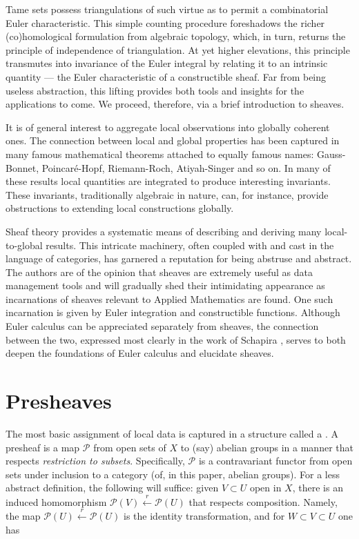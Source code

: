 \documentclass{psapm-l}
\theoremstyle{definition}
\theoremstyle{remark}
\numberwithin{equation}{section}
\begin{document}
Tame sets possess triangulations of such virtue as to permit a combinatorial Euler characteristic. This simple counting procedure foreshadows the  richer (co)homological formulation from algebraic topology, which, in turn, returns the principle of independence of triangulation. At yet higher elevations, this principle transmutes into invariance of the Euler integral by relating it to an intrinsic quantity --- the Euler characteristic of a constructible sheaf. Far from being useless abstraction, this lifting provides both tools and insights for the applications to come. We proceed, therefore, via a brief introduction to sheaves.

It is of general interest to aggregate local observations into globally coherent ones. The connection between local and global properties has been captured in many famous mathematical theorems attached to equally famous names: Gauss-Bonnet, Poincar\'e-Hopf, Riemann-Roch, Atiyah-Singer and so on. In many of these results local quantities are integrated to produce interesting invariants. These invariants, traditionally algebraic in nature, can, for instance, provide obstructions to extending local constructions globally.

Sheaf theory provides a systematic means of describing and deriving many local-to-global results. This intricate machinery, often coupled with and cast in the language of categories, has garnered a reputation for being abstruse and abstract. The authors are of the opinion that sheaves are extremely useful as data management tools and will gradually shed their intimidating appearance as incarnations of sheaves relevant to Applied Mathematics are found. One such incarnation is given by Euler integration and constructible functions. Although Euler calculus can be appreciated separately from sheaves, the connection between the two, expressed most clearly in the work of Schapira \cite{Schapira:op}, serves to both deepen the foundations of Euler calculus and elucidate sheaves.

\section{Presheaves}
\label{sec:presheaves}

The most basic assignment of local data is captured in a structure called a {{}}. A presheaf is a map ${{\mathcal P}}$ from open sets of $X$ to (say) abelian groups in a manner that respects {\em restriction to subsets}. Specifically, ${{\mathcal P}}$ is a contravariant functor from open sets under inclusion to a category (of, in this paper, abelian groups). For a less abstract definition, the following will suffice: given $V\subset U$ open in $X$, there is an induced homomorphism ${{\mathcal P}}(V)\stackrel{r}{\leftarrow}{{\mathcal P}}(U)$ that respects composition. Namely, the map ${{\mathcal P}}(U)\stackrel{r}{\leftarrow}{{\mathcal P}}(U)$ is the identity transformation, and for $W\subset V\subset U$ one has
\end{document}
